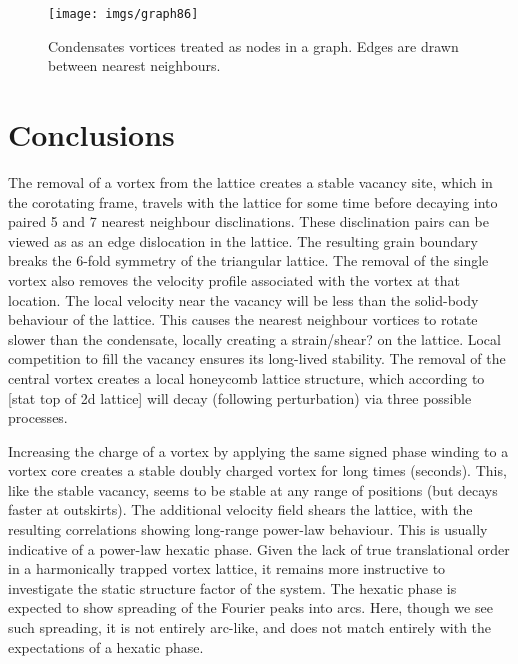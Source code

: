 \begin{figure}[tb]
	\texttt{[image: imgs/graph86]}
	\caption{Condensates vortices treated as nodes in a graph. Edges are drawn between nearest neighbours.}
\end{figure}
\section{Conclusions}\label{sec:conc}

The removal of a vortex from the lattice creates a stable vacancy site, which in the corotating frame, travels with the lattice for some time
before decaying into paired 5 and 7 nearest neighbour disclinations. These disclination pairs can be viewed as as an edge dislocation in the
lattice. The resulting grain boundary breaks the 6-fold symmetry of the triangular lattice. The removal of the single vortex also removes the
velocity profile associated with the vortex at that location. The local velocity near the vacancy will be less than the solid-body behaviour
of the lattice. This causes the nearest neighbour vortices to rotate slower than the condensate, locally creating a strain/shear? on the
lattice. Local competition to fill the vacancy ensures its long-lived stability. The removal of the central vortex creates a local honeycomb
lattice structure, which according to [stat top of 2d lattice] will decay (following perturbation) via three possible processes.

Increasing the charge of a vortex by applying the same signed phase winding to a vortex core creates a stable doubly charged vortex for long
times (seconds). This, like the stable vacancy, seems to be stable at any range of positions (but decays faster at outskirts). The additional
velocity field shears the lattice, with the resulting correlations showing long-range power-law behaviour. This is usually indicative of a
power-law hexatic phase. Given the lack of true translational order in a harmonically trapped vortex lattice, it remains more instructive to
investigate the static structure factor of the system. The hexatic phase is expected to show spreading of the Fourier peaks into arcs. Here,
though we see such spreading, it is not entirely arc-like, and does not match entirely with the expectations of a hexatic phase.




